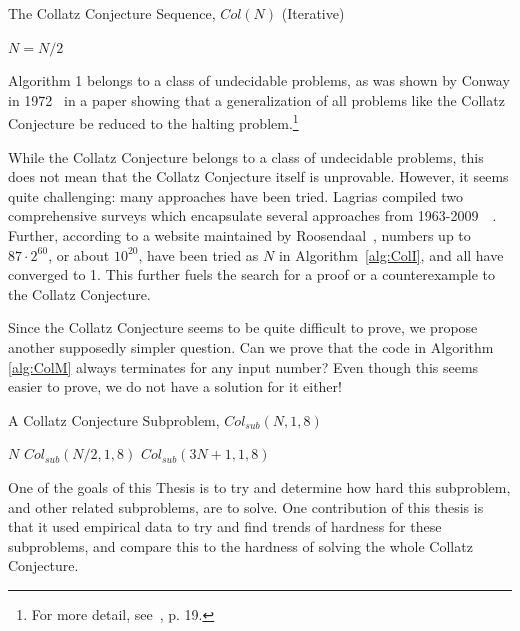 \documentclass[12pt]{article}
\newcommand{\Mod}[1]{\ (\mathrm{mod}\ #1)}
\theoremstyle{definition}
\begin{document}
\begin{algorithm} 
\caption{The Collatz Conjecture Sequence, $Col(N)$ (Iterative)}
\label{alg:ColI} 
\begin{algorithmic}[1]
    \If {$N \equiv 0 \Mod{2}$} $N = N/2$
        \Else {}
        \EndIf
    \EndWhile
\end{algorithmic}
\end{algorithm}

Algorithm 1 belongs to a class of undecidable problems, as was shown by Conway in 1972~\cite{Conway72} in a paper showing that a generalization of all problems like the Collatz Conjecture be reduced to the halting problem.\footnote{For more detail, see~\cite{2003mathLagrais}, p. 19.}\par
While the Collatz Conjecture belongs to a class of undecidable problems, this does not mean that the Collatz Conjecture itself is unprovable. However, it seems quite challenging: many approaches have been tried. Lagrias compiled two comprehensive surveys which encapsulate several approaches from 1963-2009~\cite{2003mathLagrais}~\cite{2006mathLagrias}. Further, according to a website maintained by Roosendaal~\cite{EricRoose}, numbers up to $87 \cdot 2^{60}$, or about $10^{20}$, have been tried as $N$ in Algorithm~\ref{alg:ColI}, and all have converged to 1. This further fuels the search for a proof or a counterexample to the Collatz Conjecture. \par
Since the Collatz Conjecture seems to be quite difficult to prove, we propose another supposedly simpler question. Can we prove that the code in Algorithm \ref{alg:ColM} always terminates for any input number? Even though this seems easier to prove, we do not have a solution for it either! 
\begin{algorithm} 
\caption{A Collatz Conjecture Subproblem, $Col_{sub}(N,1,8)$}
\label{alg:ColM} 
\begin{algorithmic}[1]
    \If{$(N \leq 1) \vee (N \equiv 1 \Mod{8})$ } \Return $N$
    \EndIf
    \If {$N \equiv 0 \Mod{2}$} \Return $Col_{sub}(N/2,1,8)$
    \EndIf
    \State \Return $Col_{sub}(3N + 1,1,8)$ 
\end{algorithmic}
\end{algorithm}
One of the goals of this Thesis is to try and determine how hard this subproblem, and other related subproblems, are to solve. One contribution of this thesis is that it used empirical data to try and find trends of hardness for these subproblems, and compare this to the hardness of solving the whole Collatz Conjecture. \par
\end{document}
